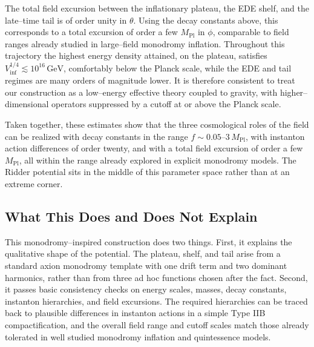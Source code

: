 \documentclass[a4paper,11pt]{article}
\begin{document}
The total field excursion between the inflationary plateau, the EDE shelf, and the late–time tail is of order unity in $\theta$. Using the decay constants above, this corresponds to a total excursion of order a few $M_{\text{Pl}}$ in $\phi$, comparable to field ranges already studied in large–field monodromy inflation. Throughout this trajectory the highest energy density attained, on the plateau, satisfies $V_{\text{inf}}^{1/4} \lesssim 10^{16}\,\text{GeV}$, comfortably below the Planck scale, while the EDE and tail regimes are many orders of magnitude lower. It is therefore consistent to treat our construction as a low–energy effective theory coupled to gravity, with higher–dimensional operators suppressed by a cutoff at or above the Planck scale.

Taken together, these estimates show that the three cosmological roles of the field can be realized with decay constants in the range $f \sim 0.05\text{--}3\,M_{\text{Pl}}$, with instanton action differences of order twenty, and with a total field excursion of order a few $M_{\text{Pl}}$, all within the range already explored in explicit monodromy models. The Ridder potential sits in the middle of this parameter space rather than at an extreme corner.


\subsection{What This Does and Does Not Explain}
\label{sec:monodromy_limits}

This monodromy–inspired construction does two things. First, it explains the qualitative shape of the potential. The plateau, shelf, and tail arise from a standard axion monodromy template with one drift term and two dominant harmonics, rather than from three ad hoc functions chosen after the fact. Second, it passes basic consistency checks on energy scales, masses, decay constants, instanton hierarchies, and field excursions. The required hierarchies can be traced back to plausible differences in instanton actions in a simple Type IIB compactification, and the overall field range and cutoff scales match those already tolerated in well studied monodromy inflation and quintessence models.
\end{document}
